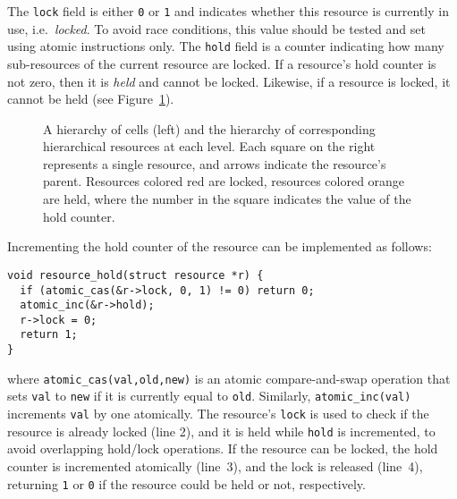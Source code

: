 \documentclass[fleqn,10pt]{wlpeerj}
\newcommand{\fig}[1]
    {Figure~\ref{fig:#1}}
\begin{document}
The {\tt lock} field is either {\tt 0} or {\tt 1} and indicates
whether this resource is currently in use, i.e.~{\em locked}.
To avoid race conditions, this value should be tested
and set using atomic instructions only.
The {\tt hold} field is a counter indicating how many
sub-resources of the current resource are locked.
If a resource's hold counter is not zero, then it is
{\em held} and cannot be locked.
Likewise, if a resource is locked, it cannot be held
(see \fig{Resources}).

\begin{figure}
    \centerline{}
    \caption{A hierarchy of cells (left) and the hierarchy of
        corresponding hierarchical resources at each level.
        Each square on the right represents a single resource, and
        arrows indicate the resource's parent.
        Resources colored red are locked, resources colored orange
        are held, where the number in the square indicates the
        value of the hold counter.}
    \label{fig:Resources}
\end{figure}

Incrementing the hold counter of the resource can be implemented
as follows:
\begin{center}\begin{minipage}{0.9\textwidth}
    \begin{lstlisting}
void resource_hold(struct resource *r) {
  if (atomic_cas(&r->lock, 0, 1) != 0) return 0;
  atomic_inc(&r->hold);
  r->lock = 0;
  return 1;
}
    \end{lstlisting}
\end{minipage}\end{center}
\noindent where {\tt atomic\_cas(val,old,new)} is an atomic
compare-and-swap operation that sets {\tt val} to {\tt new}
if it is currently equal to {\tt old}.
Similarly, {\tt atomic\_inc(val)} increments {\tt val} by one
atomically.
The resource's {\tt lock} is used to check if the resource
is already locked (line 2), and it is held while {\tt hold}
is incremented, to avoid overlapping hold/lock operations.
If the resource can be locked, the hold counter is incremented
atomically (line~3), and the lock is released (line~4),
returning {\tt 1} or {\tt 0} if the resource could be held
or not, respectively.
\end{document}
